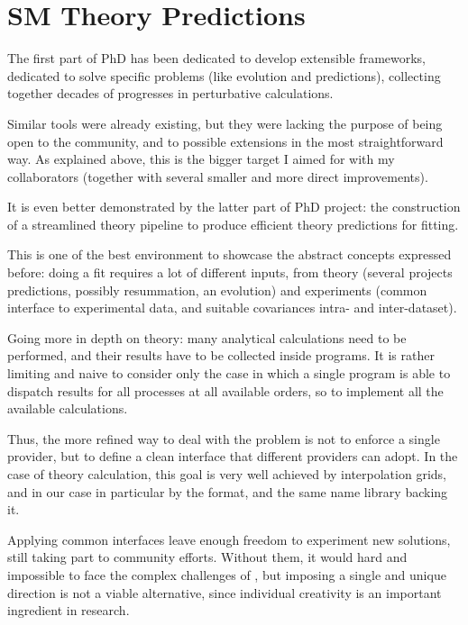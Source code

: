 \section{SM Theory Predictions}


 The first part of PhD has been dedicated to develop
extensible frameworks, dedicated to solve specific problems (like \dglap
evolution and \dis predictions), collecting together decades of progresses in
perturbative \qcd calculations.

Similar tools were already existing, but they were lacking the purpose of being
open to the community, and to possible extensions in the most straightforward
way.
As explained above, this is the bigger target I aimed for with my collaborators
(together with several smaller and more direct improvements).
\newline

 It is even better demonstrated by the latter part of PhD
project: the construction of a streamlined theory pipeline to produce efficient
theory predictions for \pdf fitting.

This is one of the best environment to showcase the abstract concepts expressed
before: doing a \pdf fit requires a lot of different inputs, from theory
(several projects predictions, possibly resummation, an \pdf evolution) and
experiments (common interface to experimental data, and suitable covariances
intra- and inter-dataset).

Going more in depth on theory: many analytical calculations need to be
performed, and their results have to be collected inside programs.
It is rather limiting and naive to consider only the case in which a single
program is able to dispatch results for all processes at all available orders,
so to implement all the available calculations.

Thus, the more refined way to deal with the problem is not to enforce a single
provider, but to define a clean interface that different providers can adopt.
In the case of theory calculation, this goal is very well achieved by
interpolation grids, and in our case in particular by the \pineappl format, and
the same name library backing it.
\newline

Applying common interfaces leave enough freedom to experiment new solutions,
still taking part to community efforts. Without them, it would hard and
impossible to face the complex challenges of \hep, but imposing a single and
unique direction is not a viable alternative, since individual creativity is an
important ingredient in research.
